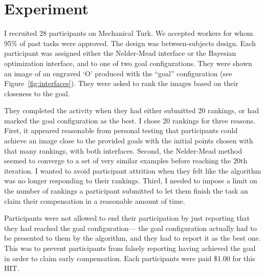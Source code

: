 \section{Experiment}

I recruited 28 participants on Mechanical Turk.
We accepted workers for whom 95\% of past tasks were approved.
The design was between-subjects design.
Each participant was assigned either the Nelder-Mead interface or the Bayesian optimization interface, and to one of two goal configurations.
They were shown an image of an engraved `O' produced with the ``goal'' configuration (see Figure~\ref{fig:interfaces}).
They were asked to rank the images based on their closeness to the goal.

They completed the activity when they had either submitted 20 rankings, or had marked the goal configuration as the best.
I chose 20 rankings for three reasons.
First, it appeared reasonable from personal testing that participants could achieve an image close to the provided goals with the initial points chosen with that many rankings, with both interfaces.
Second, the Nelder-Mead method seemed to converge to a set of very similar examples before reaching the 20th iteration.
I wanted to avoid participant attrition when they felt like the algorithm was no longer responding to their rankings.
Third, I needed to impose a limit on the number of rankings a participant submitted to let them finish the task an claim their compensation in a reasonable amount of time.

Participants were not allowed to end their participation by just reporting that they had reached the goal configuration---
the goal configuration actually had to be presented to them by the algorithm, and they had to report it as the best one.
This was to prevent participants from falsely reporting having achieved the goal in order to claim early compensation.
Each participants were paid \$1.00 for this HIT\@.

